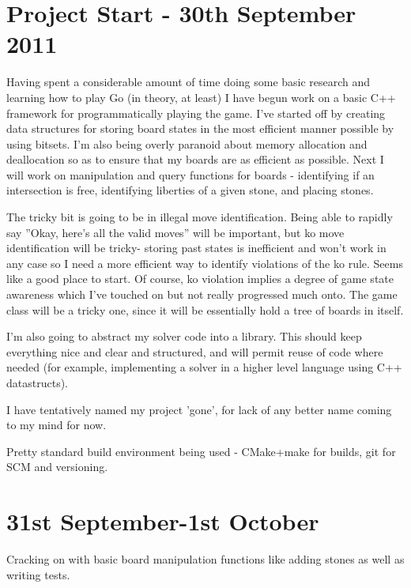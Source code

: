 \documentclass[a4paper,12pt]{article}
\begin{document}
\section*{Project Start - 30th September 2011}

Having spent a considerable amount of time doing some basic research and learning how to play Go (in theory, at least) I have begun work on a basic C++ framework for programmatically playing the game. I've started off by creating data structures for storing board states in the most efficient manner possible by using bitsets. I'm also being overly paranoid about memory allocation and deallocation so as to ensure that my boards are as efficient as possible. Next I will work on manipulation and query functions for boards - identifying if an intersection is free, identifying liberties of a given stone, and placing stones.

The tricky bit is going to be in illegal move identification. Being able to rapidly say ''Okay, here's all the valid moves'' will be important, but ko move identification will be tricky- storing past states is inefficient and won't work in any case so I need a more efficient way to identify violations of the ko rule. Seems like a good place to start. Of course, ko violation implies a degree of game state awareness which I've touched on but not really progressed much onto. The game class will be a tricky one, since it will be essentially hold a tree of boards in itself.

I'm also going to abstract my solver code into a library. This should keep everything nice and clear and structured, and will permit reuse of code where needed (for example, implementing a solver in a higher level language using C++ datastructs).

I have tentatively named my project 'gone', for lack of any better name coming to my mind for now.

Pretty standard build environment being used - CMake+make for builds, git for SCM and versioning.

\section*{31st September-1st October}

Cracking on with basic board manipulation functions like adding stones as well as writing tests.
\end{document}
